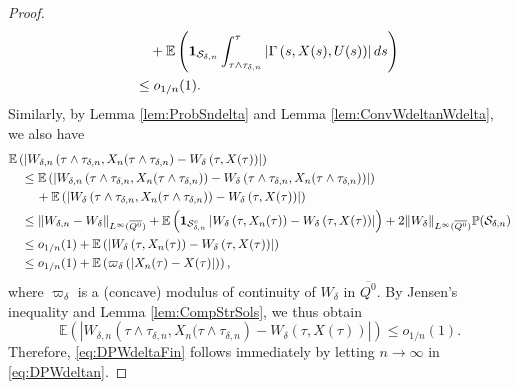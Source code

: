 \documentclass[amscd,amssymb,11pt]{article}
\numberwithin{theorem}{section}
\numberwithin{equation}{section}
\begin{document}
\begin{proof}
\begin{align*}
&\qquad +\mathbb{E}\left({\bf 1}_{\mathcal{S}_{\delta,n}}\int_{\tau\wedge\tau_{\delta,n}}^{\tau}\left|\Gamma\left(s,X(s),U(s)\right)\right|ds\right)\\
&\quad\leq o_{1/n}(1).
\end{align*}
Similarly, by Lemma \ref{lem:ProbSndelta} and Lemma \ref{lem:ConvWdeltanWdelta}, we also have
\begin{align*}
&\mathbb{E}\left(\left|W_{\delta,n}\left(\tau\wedge\tau_{\delta,n},X_{n}(\tau\wedge\tau_{\delta,n}\right)-W_{\delta}\left(\tau,X(\tau)\right)\right|\right)\\
&\quad\leq\mathbb{E}\left(\left|W_{\delta,n}\left(\tau\wedge\tau_{\delta,n},X_{n}(\tau\wedge\tau_{\delta,n})\right)-W_{\delta}\left(\tau\wedge\tau_{\delta,n},X_{n}(\tau\wedge\tau_{\delta,n})\right)\right|\right)\\
&\qquad\,+\mathbb{E}\left(\left|W_{\delta}\left(\tau\wedge\tau_{\delta,n},X_{n}(\tau\wedge\tau_{\delta,n})\right)-W_{\delta}\left(\tau,X(\tau)\right)\right|\right)\\
&\quad\leq\left\|W_{\delta,n}-W_{\delta}\right\|_{L^{\infty}(\overline{Q^{0}})}+\mathbb{E}\left({\bf 1}_{\mathcal{S}_{\delta,n}^{c}}\left|W_{\delta}\left(\tau,X_{n}(\tau)\right)-W_{\delta}\left(\tau,X(\tau)\right)\right|\right)+2\|W_{\delta}\|_{L^{\infty}(\overline{Q^{0}})}\mathbb{P}(\mathcal{S}_{\delta,n})\\
&\quad\leq o_{1/n}(1)+\mathbb{E}\left(\left|W_{\delta}\left(\tau,X_{n}(\tau)\right)-W_{\delta}\left(\tau,X(\tau)\right)\right|\right)\\
&\quad\leq o_{1/n}(1)+\mathbb{E}\left(\varpi_{\delta}\left(|X_n(\tau)-X(\tau)|\right)\right),
\end{align*}
where $\varpi_{\delta}$ is a (concave) modulus of continuity of $W_\delta$ in $\overline{Q^0}$. By Jensen's inequality and Lemma \ref{lem:CompStrSols}, we thus obtain
\begin{equation*}
\mathbb{E}\left(\left|W_{\delta,n}\left(\tau\wedge\tau_{\delta,n},X_{n}(\tau\wedge\tau_{\delta,n}\right)-W_{\delta}\left(\tau,X(\tau)\right)\right|\right)\leq o_{1/n}(1).
\end{equation*}
Therefore, \eqref{eq:DPWdeltaFin} follows immediately by letting $n\rightarrow\infty$ in \eqref{eq:DPWdeltan}.
\end{proof}
\end{document}
